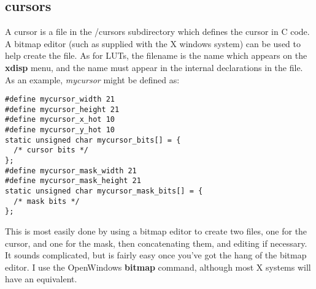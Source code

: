 \subsection{cursors}
A cursor is a file in the /cursors subdirectory which defines the cursor in C code. A bitmap editor (such as supplied with the X windows system) can be used to help create the file. As for LUTs, the filename is the name which appears on the {\bf xdisp} menu, and the name must appear in the internal declarations in the file. As an example, {\it mycursor\/} might be defined as:
\begin{verbatim}
#define mycursor_width 21
#define mycursor_height 21
#define mycursor_x_hot 10
#define mycursor_y_hot 10
static unsigned char mycursor_bits[] = {
  /* cursor bits */
};
#define mycursor_mask_width 21
#define mycursor_mask_height 21
static unsigned char mycursor_mask_bits[] = {
  /* mask bits */
};
\end{verbatim}
This is most easily done by using a bitmap editor to create two files, one for the cursor, and one for the mask, then concatenating them, and editing if necessary. It sounds complicated, but is fairly easy once you've got the hang of the bitmap editor. I use the OpenWindows {\bf bitmap} command, although most X systems will have an equivalent.


